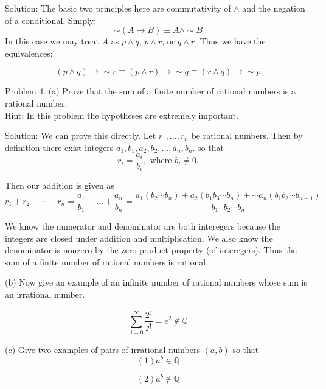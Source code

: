 \documentclass[16 pt]{amsart}
\theoremstyle{definition}
\theoremstyle{remark}
\numberwithin{equation}{subsection}
\newcommand{\Q}{\mathbb{Q}}
\begin{document}
\vspace{.5in}


Solution: The basic two principles here are commutativity of $\wedge$ and the negation of a conditional.  Simply:
\[
\sim (A\rightarrow B) \equiv A \wedge \sim B
\]
In this case we may treat $A$ as $p\wedge q$, $p\wedge r$, or $q\wedge r$.  Thus we have the equivalences:

\[
(p\wedge q)\rightarrow \sim r \equiv (p\wedge r)\rightarrow \sim q \equiv (r\wedge q)\rightarrow \sim p
\]


\newpage

Problem 4. (a) Prove that the sum of a finite number of rational numbers is a rational number.  \\
Hint: In this problem the hypotheses are extremely important.

\vspace{.5in}

Solution: We can prove this directly.  Let $r_1,\dots, r_n$ be rational numbers.  Then by definition there exist integers $a_1,b_1,a_2,b_2,\dots, a_n,b_n$. so that
\[
r_i = \frac{a_i}{b_i}, \text{ where } b_i \ne 0.
\]

Then our addition is given as
\[
r_1+r_2+\cdots + r_n = \frac{a_1}{b_1}+\dots+\frac{a_n}{b_n} = \frac{a_1(b_2\cdots b_n)+ a_2(b_1b_3\cdots b_n)+ \cdots a_n(b_1b_2\cdots b_{n-1})}{b_1\cdot b_2 \cdots b_n}
\]

We know the numerator and denominator are both interegers because the integers are closed under addition and multiplication.  We also know the denominator is nonzero by the zero product property (of interegers).  Thus the sum of a finite number of rational numbers is rational.

\vspace{.5in}

(b) Now give an example of an infinite number of rational numbers whose sum is an irrational number.\\

\vspace{.5in}

\[
\sum_{j=0}^{\infty} \frac{2^j}{j!} = e^2 \notin \Q
\]

\vspace{.5in}

(c) Give two examples of pairs of irrational numbers $(a,b)$ so that 
\[
(1) a^b \in \Q
\]

\[
(2) a^b \notin \Q
\]

\vspace{.5in}
\end{document}
